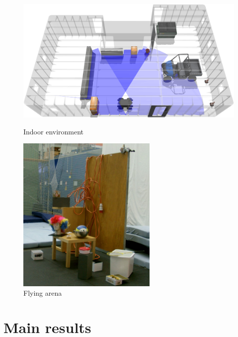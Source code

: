 \documentclass[9pt,a4paper]{extarticle}
\begin{document}
\begin{multicols}{2}
\begin{figure}[H]
	\centering
	\begin{minipage}[b]{0.23\textwidth}
		\centering
		\includegraphics[width=\textwidth]{guardian-environment-cluttered-dynamic}
		\caption{\small Indoor environment}
		\label{fig:guardian-environment}
	\end{minipage}\hfill
	\begin{minipage}[b]{0.23\textwidth}
		\centering
		\includegraphics[width=0.6\textwidth]{kinect-flying-arena}
		\caption{\small Flying arena \cite{Pomerleau2011}}
		\label{fig:kinect-environment}
	\end{minipage}
\end{figure}



\section{Main results}


\end{multicols}
\end{document}
